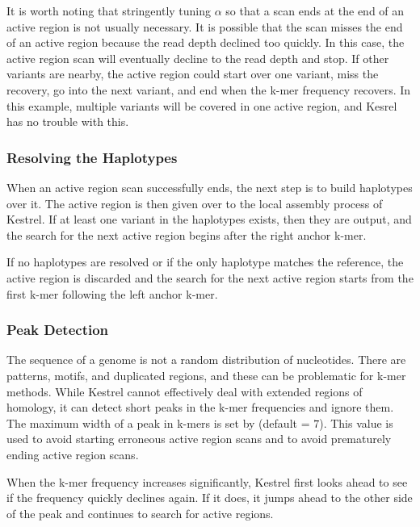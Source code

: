 It is worth noting that stringently tuning $\alpha$ so that a scan ends at the end of an active region is not usually necessary. It is possible that the scan misses the end of an active region because the read depth declined too quickly. In this case, the active region scan will eventually decline to the read depth and stop. If other variants are nearby, the active region could start over one variant, miss the recovery, go into the next variant, and end when the k-mer frequency recovers. In this example, multiple variants will be covered in one active region, and Kesrel has no trouble with this.

\subsubsection{Resolving the Haplotypes}
\label{sec.process.ardetect.resolve}

When an active region scan successfully ends, the next step is to build haplotypes over it. The active region is then given over to the local assembly process of Kestrel. If at least one variant in the haplotypes exists, then they are output, and the search for the next active region begins after the right anchor k-mer.

If no haplotypes are resolved or if the only haplotype matches the reference, the active region is discarded and the search for the next active region starts from the first k-mer following the left anchor k-mer.

\subsubsection{Peak Detection}
\label{sec.process.ardetect.peak}

The sequence of a genome is not a random distribution of nucleotides. There are patterns, motifs, and duplicated regions, and these can be problematic for k-mer methods. While Kestrel cannot effectively deal with extended regions of homology, it can detect short peaks in the k-mer frequencies and ignore them. The maximum width of a peak in k-mers is set by  (default = $7$). This value is used to avoid starting erroneous active region scans and to avoid prematurely ending active region scans.

When the k-mer frequency increases significantly, Kestrel first looks ahead to see if the frequency quickly declines again. If it does, it jumps ahead to the other side of the peak and continues to search for active regions.

